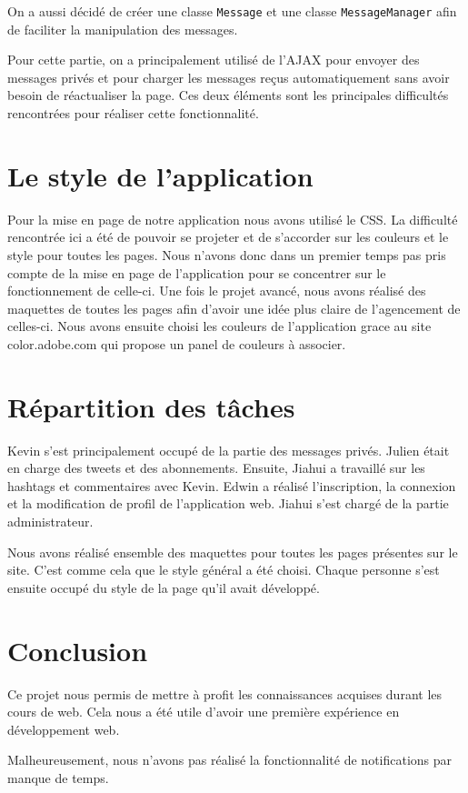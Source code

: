 \documentclass[a4paper, 12pt]{article}
\begin{document}
On a aussi décidé de créer une classe \texttt{Message} et une classe \texttt{MessageManager} afin de faciliter la manipulation des messages. 

\vspace{1\baselineskip}

Pour cette partie, on a principalement utilisé de l'AJAX pour envoyer des messages privés et pour charger les messages reçus automatiquement sans avoir besoin de réactualiser la page. Ces deux éléments sont les principales difficultés rencontrées pour réaliser cette fonctionnalité.


\newpage
\section{Le style de l'application}
Pour la mise en page de notre application nous avons utilisé le CSS. La difficulté rencontrée ici a été de pouvoir se projeter et de s'accorder sur les couleurs et le style pour toutes les pages. Nous n'avons donc dans un premier temps pas pris compte de la mise en page de l'application pour se concentrer sur le fonctionnement de celle-ci.
Une fois le projet avancé, nous avons réalisé des maquettes de toutes les pages afin d'avoir une idée plus claire de l'agencement de celles-ci. Nous avons ensuite choisi les couleurs de l'application grace au site color.adobe.com qui propose un panel de couleurs à associer.


\section{Répartition des tâches}

Kevin s'est principalement occupé de la partie des messages privés. Julien était en charge des tweets et des abonnements. Ensuite, Jiahui a travaillé sur les hashtags et commentaires avec Kevin. Edwin a réalisé l'inscription, la connexion et la modification de profil de l'application web. Jiahui s'est chargé de la partie administrateur.

Nous avons réalisé ensemble des maquettes pour toutes les pages présentes sur le site. C'est comme cela que le style général a été choisi. Chaque personne s'est ensuite occupé du style de la page qu'il avait développé.

\section{Conclusion}		

Ce projet nous permis de mettre à profit les connaissances acquises durant les cours de web. Cela nous a été utile d'avoir une première expérience en développement web. 


Malheureusement, nous n'avons pas réalisé la fonctionnalité de notifications par manque de temps. 
\end{document}
